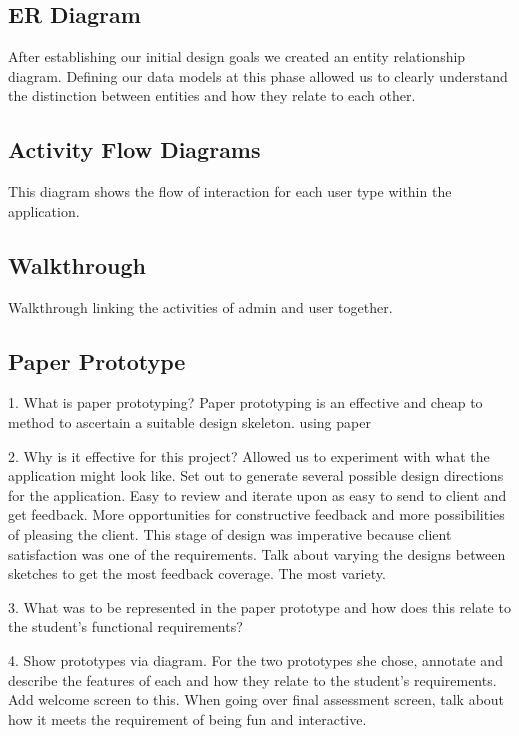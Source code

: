 \documentclass{l3proj}
\begin{document}
\subsection{ER Diagram}
	
After establishing our initial design goals we created an entity relationship diagram. Defining our data models at this phase allowed us to clearly understand the distinction between entities and how they relate to each other.



\subsection{Activity Flow Diagrams}
	
This diagram shows the flow of interaction for each user type within the application. 

\subsection{Walkthrough}
	
Walkthrough linking the activities of admin and user together.

\subsection{Paper Prototype}

1. What is paper prototyping?
Paper prototyping is an effective and cheap to method to ascertain a suitable design skeleton. using paper

2. Why is it effective for this project?
Allowed us to experiment with what the application might look like.
Set out to generate several possible design directions for the application.
Easy to review and iterate upon as easy to send to client and get feedback.
More opportunities for constructive feedback and more possibilities of pleasing the client.
This stage of design was imperative because client satisfaction was one of the requirements.
Talk about varying the designs between sketches to get the most feedback coverage. The most variety.

3. What was to be represented in the paper prototype and how does this relate to the student's functional requirements?
   
4. Show prototypes via diagram.
For the two prototypes she chose, annotate and describe the features of each and how they relate to the student's requirements. Add welcome screen to this. When going over final assessment screen, talk about how it meets the requirement of being fun and interactive.
\end{document}
